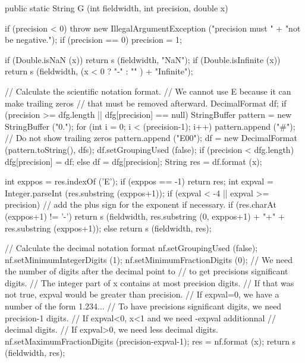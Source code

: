\begin{code}

   public static String G (int fieldwidth, int precision, double x)\begin{hide} {
        if (precision < 0)
            throw new IllegalArgumentException ("precision must " +
                                               "not be negative.");
        if (precision == 0)
            precision = 1;

        if (Double.isNaN (x))
           return s (fieldwidth, "NaN");
        if (Double.isInfinite (x))
           return s (fieldwidth, (x < 0 ? "-" : "" ) + "Infinite");

        // Calculate the scientific notation format.
        // We cannot use E because it can make trailing zeros
        // that must be removed afterward.
        DecimalFormat df;
        if (precision >= dfg.length || dfg[precision] == null) {
          StringBuffer pattern = new StringBuffer ("0.");
          for (int i = 0; i < (precision-1); i++)
              pattern.append ("#"); // Do not show trailing zeros
          pattern.append ("E00");
          df = new DecimalFormat (pattern.toString(), dfs);
          df.setGroupingUsed (false);
          if (precision < dfg.length)
            dfg[precision] = df;
        }
        else
          df = dfg[precision];
        String res = df.format (x);

        int exppos = res.indexOf ('E');
        if (exppos == -1)
           return res;
        int expval = Integer.parseInt (res.substring (exppos+1));
        if (expval < -4 || expval >= precision) {
           // add the plus sign for the exponent if necessary.
           if (res.charAt (exppos+1) != '-')
               return s (fieldwidth, res.substring (0, exppos+1) + "+" +
                          res.substring (exppos+1));
           else
               return s (fieldwidth, res);
        }

        // Calculate the decimal notation format
        nf.setGroupingUsed (false);
        nf.setMinimumIntegerDigits (1);
        nf.setMinimumFractionDigits (0);
        // We need the number of digits after the decimal point to
        // to get precisions significant digits.
        // The integer part of x contains at most precision digits.
        // If that was not true, expval would be greater than precision.
        // If expval=0, we have a number of the form 1.234...
        // To have precisions significant digits, we need precision-1 digits.
        // If expval<0, x<1 and we need -expval additionnal
        // decimal digits.
        // If expval>0, we need less decimal digits.
        nf.setMaximumFractionDigits (precision-expval-1);
        res = nf.format (x);
        return s (fieldwidth, res);
   }\end{hide}
\end{code}
